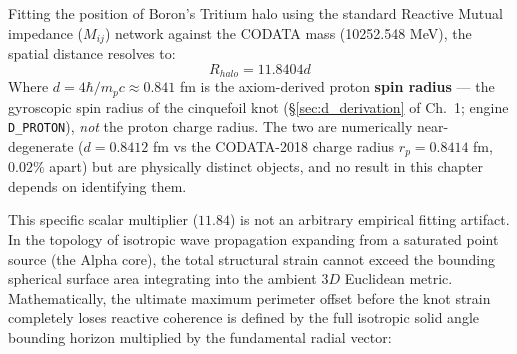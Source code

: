 Fitting the position of Boron's Tritium halo using the standard Reactive Mutual impedance ($M_{ij}$) network against the CODATA mass (10252.548 MeV), the spatial distance resolves to:
\begin{equation}
    R_{halo} = 11.8404 d
\end{equation}
Where $d = 4\hbar/m_pc \approx 0.841$ fm is the axiom-derived proton \textbf{spin radius} --- the gyroscopic spin radius of the cinquefoil knot (\S\ref{sec:d_derivation} of Ch.~1; engine \texttt{D\_PROTON}), \emph{not} the proton charge radius. The two are numerically near-degenerate ($d = 0.8412$ fm vs the CODATA-2018 charge radius $r_p = 0.8414$ fm, $0.02\%$ apart) but are physically distinct objects, and no result in this chapter depends on identifying them.

This specific scalar multiplier ($11.84$) is not an arbitrary empirical fitting artifact. In the topology of isotropic wave propagation expanding from a saturated point source (the Alpha core), the total structural strain cannot exceed the bounding spherical surface area integrating into the ambient $3D$ Euclidean metric. Mathematically, the ultimate maximum perimeter offset before the knot strain completely loses reactive coherence is defined by the full isotropic solid angle bounding horizon multiplied by the fundamental radial vector:

